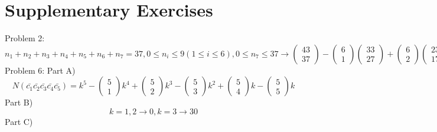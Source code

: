 \documentclass{article}
\begin{document}
\section{Supplementary Exercises}
Problem 2:
$$
n_1+n_2+n_3+n_4+n_5+n_6+n_7=37,0\leq n_i \leq 9(1\leq i \leq 6),0\leq n_7 \leq 37
\rightarrow
\left(\begin{array}{c}
43\\
37
\end{array}\right)
-
\left(\begin{array}{c}
6\\
1
\end{array}\right)
\left(\begin{array}{c}
33\\
27
\end{array}\right)
+
\left(\begin{array}{c}
6\\
2
\end{array}\right)
\left(\begin{array}{c}
23\\
17
\end{array}\right)
-
\left(\begin{array}{c}
6\\
3
\end{array}\right)
\left(\begin{array}{c}
13\\
7
\end{array}\right)
=930931
$$
Problem 6: Part A)
$$
N(\bar{c_1}\bar{c_2}\bar{c_3}\bar{c_4}\bar{c_5})
=
k^5
-
\left(\begin{array}{c}
5\\
1
\end{array}\right)
k^4
+
\left(\begin{array}{c}
5\\
2
\end{array}\right)
k^3
-
\left(\begin{array}{c}
5\\
3
\end{array}\right)
k^2
+
\left(\begin{array}{c}
5\\
4
\end{array}\right)
k
-
\left(\begin{array}{c}
5\\
5
\end{array}\right)
k
$$
Part B)
$$
k=1,2 \rightarrow 0,k=3 \rightarrow 30
$$
Part C)
\end{document}
